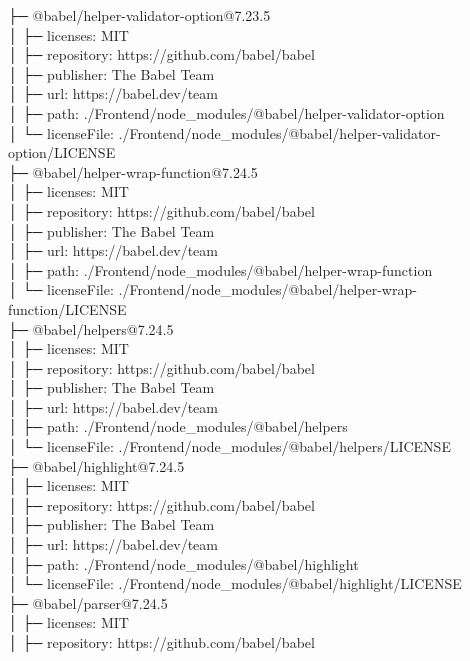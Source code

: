 ├─ @babel/helper-validator-option@7.23.5\\
│  ├─ licenses: MIT\\
│  ├─ repository: https://github.com/babel/babel\\
│  ├─ publisher: The Babel Team\\
│  ├─ url: https://babel.dev/team\\
│  ├─ path: ./Frontend/node\_modules/@babel/helper-validator-option\\
│  └─ licenseFile: ./Frontend/node\_modules/@babel/helper-validator-option/LICENSE\\
├─ @babel/helper-wrap-function@7.24.5\\
│  ├─ licenses: MIT\\
│  ├─ repository: https://github.com/babel/babel\\
│  ├─ publisher: The Babel Team\\
│  ├─ url: https://babel.dev/team\\
│  ├─ path: ./Frontend/node\_modules/@babel/helper-wrap-function\\
│  └─ licenseFile: ./Frontend/node\_modules/@babel/helper-wrap-function/LICENSE\\
├─ @babel/helpers@7.24.5\\
│  ├─ licenses: MIT\\
│  ├─ repository: https://github.com/babel/babel\\
│  ├─ publisher: The Babel Team\\
│  ├─ url: https://babel.dev/team\\
│  ├─ path: ./Frontend/node\_modules/@babel/helpers\\
│  └─ licenseFile: ./Frontend/node\_modules/@babel/helpers/LICENSE\\
├─ @babel/highlight@7.24.5\\
│  ├─ licenses: MIT\\
│  ├─ repository: https://github.com/babel/babel\\
│  ├─ publisher: The Babel Team\\
│  ├─ url: https://babel.dev/team\\
│  ├─ path: ./Frontend/node\_modules/@babel/highlight\\
│  └─ licenseFile: ./Frontend/node\_modules/@babel/highlight/LICENSE\\
├─ @babel/parser@7.24.5\\
│  ├─ licenses: MIT\\
│  ├─ repository: https://github.com/babel/babel\\
